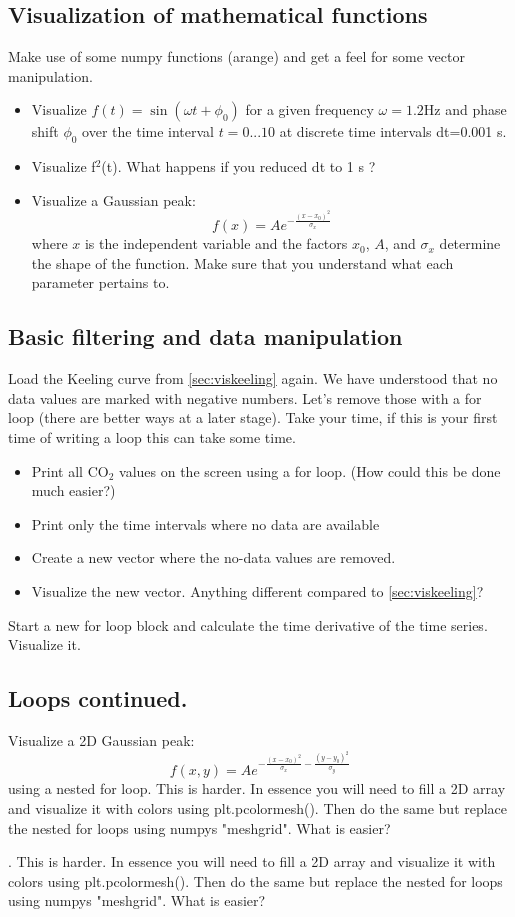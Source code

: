 \subsection{Visualization of mathematical functions}
\label{sec:mathfunc}
Make use of some numpy functions (arange) and get a feel for some vector manipulation.
\begin{itemize}
  \item Visualize $f(t)=\sin(\omega t + \phi_0)$ for a given frequency $\omega=1.2$Hz and phase shift $\phi_0$ over the time interval $t=0...10$ at discrete time intervals dt=0.001 s.
  \item Visualize f$^2$(t). What happens if you reduced dt to 1 s ?
  \item Visualize a Gaussian peak:
  $$
  f(x) = Ae^{-\frac{(x-x_0)^2}{\sigma_x}}
  $$
  where $x$ is the independent variable and the factors $x_0$, $A$, and $\sigma_x$ determine the shape of the function. Make sure that you understand what each parameter pertains to.
\end{itemize}

\subsection{Basic filtering and data manipulation}
\label{sec:loops}
Load the Keeling curve from \ref{sec:viskeeling} again. We have understood that no data values are marked with negative numbers. Let's remove those with a for loop (there are better ways at a later stage). Take your time, if this is your first time of writing a loop this can take some time.
\begin{itemize}
  \item Print all CO$_2$ values on the screen using a for loop. (How could this be done much easier?)
  \item Print only the time intervals where no data are available
  \item Create a new vector where the no-data values are removed.
  \item Visualize the new vector. Anything different compared to \ref{sec:viskeeling}?
\end{itemize}
Start a new for loop block and calculate the time derivative of the time series. Visualize it. 

\subsection{Loops continued.}
Visualize a 2D Gaussian peak:
$$
f(x,y) = Ae^{-\frac{(x-x_0)^2}{\sigma_x}-\frac{(y-y_0)^2}{\sigma_y}}
$$
using a nested for loop. This is harder. In essence you will need to fill a 2D array and visualize it with colors using plt.pcolormesh(). Then do the same but replace the nested for loops using numpys "meshgrid". What is easier?

. This is harder. In essence you will need to fill a 2D array and visualize it with colors using plt.pcolormesh(). Then do the same but replace the nested for loops using numpys "meshgrid". What is easier?




